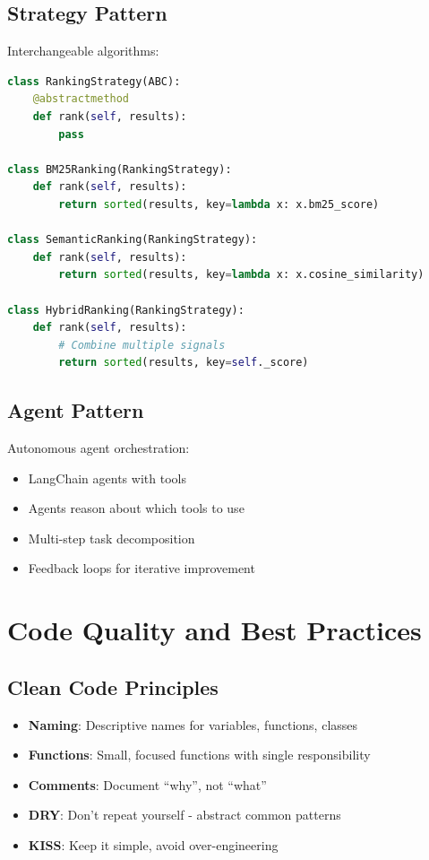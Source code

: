 \documentclass[12pt,a4paper]{report}
\begin{document}
\subsection{Strategy Pattern}

Interchangeable algorithms:

\begin{lstlisting}[language=Python, caption=Strategy Pattern Example]
class RankingStrategy(ABC):
    @abstractmethod
    def rank(self, results):
        pass

class BM25Ranking(RankingStrategy):
    def rank(self, results):
        return sorted(results, key=lambda x: x.bm25_score)

class SemanticRanking(RankingStrategy):
    def rank(self, results):
        return sorted(results, key=lambda x: x.cosine_similarity)

class HybridRanking(RankingStrategy):
    def rank(self, results):
        # Combine multiple signals
        return sorted(results, key=self._score)
\end{lstlisting}

\subsection{Agent Pattern}

Autonomous agent orchestration:

\begin{itemize}[label=\textbullet]
    \item LangChain agents with tools
    \item Agents reason about which tools to use
    \item Multi-step task decomposition
    \item Feedback loops for iterative improvement
\end{itemize}

\section{Code Quality and Best Practices}

\subsection{Clean Code Principles}

\begin{itemize}[label=\textbullet]
    \item \textbf{Naming}: Descriptive names for variables, functions, classes
    \item \textbf{Functions}: Small, focused functions with single responsibility
    \item \textbf{Comments}: Document ``why'', not ``what''
    \item \textbf{DRY}: Don't repeat yourself - abstract common patterns
    \item \textbf{KISS}: Keep it simple, avoid over-engineering
\end{itemize}
\end{document}
